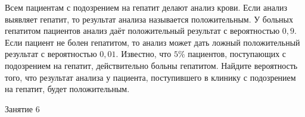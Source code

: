 \begin{class}[number=5]
\begin{listofex}
\begin{minipage}[t]{\bodywidth}
			\end{minipage}
		\end{listofex}
		\newpage
		\begin{listofex}[resume]
			\item Всем пациентам с подозрением на гепатит делают анализ крови. Если анализ выявляет гепатит, то результат анализа называется положительным. У больных гепатитом пациентов анализ даёт положительный результат с вероятностью \( 0,9 \). Если пациент не болен гепатитом, то анализ может дать ложный положительный результат с вероятностью \( 0,01 \). Известно, что \( 5\% \) пациентов, поступающих с подозрением на гепатит, действительно больны гепатитом. Найдите вероятность того, что результат анализа у пациента, поступившего в клинику с подозрением на гепатит, будет положительным.	
	\end{listofex}
	\end{class}
	
	\begin{class}[number=6]
		\begin{listofex}
			\item Занятие 6
		\end{listofex}
	\end{class}
	
